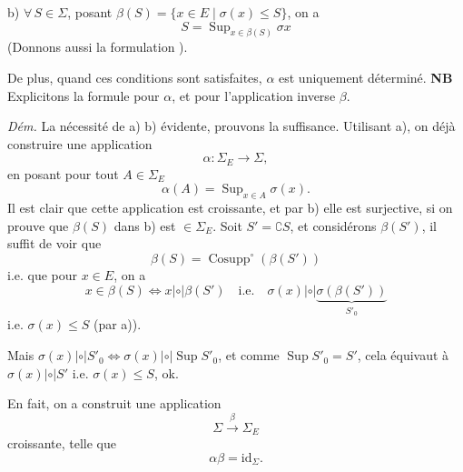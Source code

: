\documentclass[11pt,a4paper]{article}
\begin{document}

b) $\forall\, S \in \Sigma$, posant $\beta(S) = \{x \in E \mid \sigma(x) \leq S\}$, on a
\[
  S = \operatorname{Sup}_{x \in \beta(S)} \sigma x
\]
(Donnons aussi la formulation  ).


De plus, quand ces conditions sont satisfaites,   $\alpha$ est uniquement déterminé. \textbf{NB} Explicitons la formule pour $\alpha$, et pour l'application inverse $\beta$.

\emph{Dém.} La nécessité de a) b) évidente, prouvons la suffisance.
 Utilisant a), on  déjà construire une application
\[
  \alpha : \Sigma_E \longrightarrow \Sigma,
\]
en posant pour tout $A \in \Sigma_E$
\[
  \alpha(A) = \operatorname{Sup}_{x \in A} \sigma(x).
\]
Il est clair que cette application est croissante, et par b) elle est surjective, \struck{\ill{}}  si on prouve que $\beta(S)$ dans b) est $\in \Sigma_E$. Soit $S' = \complement S$, et considérons $\beta(S')$, il suffit de voir que
\[
  \beta(S) = \operatorname{Cosupp}^{\circ}(\beta(S'))
\]
i.e. que pour $x \in E$, on a
\[
  x \in \beta(S) \iff x \mathrel{|\circ|} \beta(S') \quad \text{i.e.} \quad \sigma(x) \mathrel{|\circ|} \underbrace{\sigma(\beta(S'))}_{S'_0}
\]
i.e. $\sigma(x) \leq S$ (par a)).

Mais $\sigma(x) \mathrel{|\circ|} S'_0 \iff \sigma(x) \mathrel{|\circ|} \operatorname{Sup} S'_0$, et comme $\operatorname{Sup} S'_0 = S'$, cela équivaut à $\sigma(x) \mathrel{|\circ|} S'$ i.e. $\sigma(x) \leq S$, ok.


En fait, on a  construit une application
\[
  \Sigma \xrightarrow{\ \beta\ } \Sigma_E
\]
 croissante, telle que
\[
  \alpha\beta = \mathrm{id}_{\Sigma} .
\]
\end{document}
